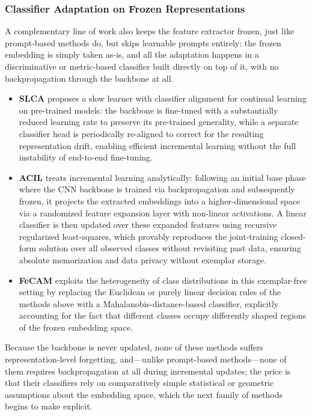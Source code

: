 \subsubsection{Classifier Adaptation on Frozen Representations}
A complementary line of work also keeps the feature extractor frozen, just like prompt-based methods do, but skips learnable prompts entirely: the frozen embedding is simply taken as-is, and all the adaptation happens in a discriminative or metric-based classifier built directly on top of it, with no backpropagation through the backbone at all.

\begin{itemize}
	\item \textbf{SLCA} \cite{zhang2023slca} proposes a slow learner with classifier alignment for continual learning on pre-trained models: the backbone is fine-tuned with a substantially reduced learning rate to preserve its pre-trained generality, while a separate classifier head is periodically re-aligned to correct for the resulting representation drift, enabling efficient incremental learning without the full instability of end-to-end fine-tuning.
	\item \textbf{ACIL} \cite{zhuang2022acil} treats incremental learning analytically: following an initial base phase where the CNN backbone is trained via backpropagation and subsequently frozen, it projects the extracted embeddings into a higher-dimensional space via a randomized feature expansion layer with non-linear activations. A linear classifier is then updated over these expanded features using recursive regularized least-squares, which provably reproduces the joint-training closed-form solution over all observed classes without revisiting past data, ensuring absolute memorization and data privacy without exemplar storage.
	\item \textbf{FeCAM} \cite{goswami2024fecam} exploits the heterogeneity of class distributions in this exemplar-free setting by replacing the Euclidean or purely linear decision rules of the methods above with a Mahalanobis-distance-based classifier, explicitly accounting for the fact that different classes occupy differently shaped regions of the frozen embedding space.
\end{itemize}

Because the backbone is never updated, none of these methods suffers representation-level forgetting, and---unlike prompt-based methods---none of them requires backpropagation at all during incremental updates; the price is that their classifiers rely on comparatively simple statistical or geometric assumptions about the embedding space, which the next family of methods begins to make explicit.

